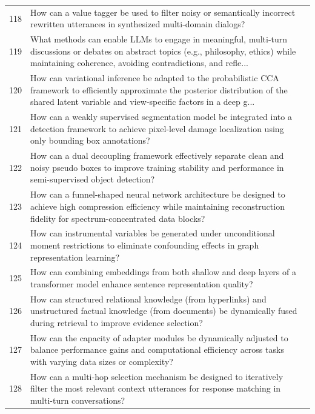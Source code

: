 \begin{longtable}{p{0.8cm}p{9cm}p{2.5cm}}
118 & How can a value tagger be used to filter noisy or semantically incorrect rewritten utterances in synthesized multi-domain dialogs? & \cite{10.18653/v1/2023.emnlp-main.946} \\
119 & What methods can enable LLMs to engage in meaningful, multi-turn discussions or debates on abstract topics (e.g., philosophy, ethics) while maintaining coherence, avoiding contradictions, and refle... & \cite{10.18653/v1/2023.emnlp-main.146} \\
120 & How can variational inference be adapted to the probabilistic CCA framework to efficiently approximate the posterior distribution of the shared latent variable and view-specific factors in a deep g... & \cite{10.1609/aaai.v35i9.16982} \\
121 & How can a weakly supervised segmentation model be integrated into a detection framework to achieve pixel-level damage localization using only bounding box annotations? & \cite{10.1609/aaai.v34i09.7110} \\
122 & How can a dual decoupling framework effectively separate clean and noisy pseudo boxes to improve training stability and performance in semi-supervised object detection? & \cite{10.1609/aaai.v36i3.20264} \\
123 & How can a funnel-shaped neural network architecture be designed to achieve high compression efficiency while maintaining reconstruction fidelity for spectrum-concentrated data blocks? & \cite{10.1609/aaai.v37i4.25602} \\
124 & How can instrumental variables be generated under unconditional moment restrictions to eliminate confounding effects in graph representation learning? & \cite{10.1609/aaai.v37i6.25925} \\
125 & How can combining embeddings from both shallow and deep layers of a transformer model enhance sentence representation quality? & \cite{10.18653/v1/2021.findings-emnlp.23} \\
126 & How can structured relational knowledge (from hyperlinks) and unstructured factual knowledge (from documents) be dynamically fused during retrieval to improve evidence selection? & \cite{10.1609/aaai.v35i15.17568} \\
127 & How can the capacity of adapter modules be dynamically adjusted to balance performance gains and computational efficiency across tasks with varying data sizes or complexity? & \cite{10.18653/v1/d19-1165} \\
128 & How can a multi-hop selection mechanism be designed to iteratively filter the most relevant context utterances for response matching in multi-turn conversations? & \cite{10.18653/v1/d19-1011} \\

\end{longtable}
